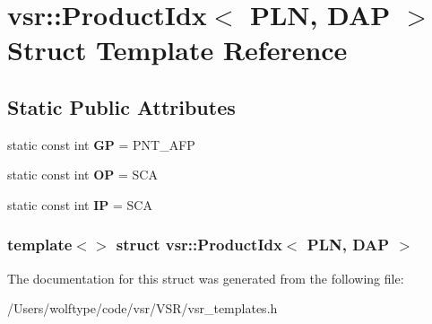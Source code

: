\hypertarget{structvsr_1_1_product_idx_3_01_p_l_n_00_01_d_a_p_01_4}{\section{vsr\-:\-:Product\-Idx$<$ P\-L\-N, D\-A\-P $>$ Struct Template Reference}
\label{structvsr_1_1_product_idx_3_01_p_l_n_00_01_d_a_p_01_4}
}
\subsection*{Static Public Attributes}
\begin{DoxyCompactItemize}
\item 
\hypertarget{structvsr_1_1_product_idx_3_01_p_l_n_00_01_d_a_p_01_4_ade7f890a6623b51ea5bf63cd946569c3}{static const int {\bfseries G\-P} = P\-N\-T\-\_\-\-A\-F\-P}\label{structvsr_1_1_product_idx_3_01_p_l_n_00_01_d_a_p_01_4_ade7f890a6623b51ea5bf63cd946569c3}

\item 
\hypertarget{structvsr_1_1_product_idx_3_01_p_l_n_00_01_d_a_p_01_4_a0d64e8c7efe739c5671dfcf233463756}{static const int {\bfseries O\-P} = S\-C\-A}\label{structvsr_1_1_product_idx_3_01_p_l_n_00_01_d_a_p_01_4_a0d64e8c7efe739c5671dfcf233463756}

\item 
\hypertarget{structvsr_1_1_product_idx_3_01_p_l_n_00_01_d_a_p_01_4_a71ac3363da22992fb98fa59dcbc66002}{static const int {\bfseries I\-P} = S\-C\-A}\label{structvsr_1_1_product_idx_3_01_p_l_n_00_01_d_a_p_01_4_a71ac3363da22992fb98fa59dcbc66002}

\end{DoxyCompactItemize}
\subsubsection*{template$<$$>$ struct vsr\-::\-Product\-Idx$<$ P\-L\-N, D\-A\-P $>$}



The documentation for this struct was generated from the following file\-:\begin{DoxyCompactItemize}
\item 
/\-Users/wolftype/code/vsr/\-V\-S\-R/vsr\-\_\-templates.\-h\end{DoxyCompactItemize}
